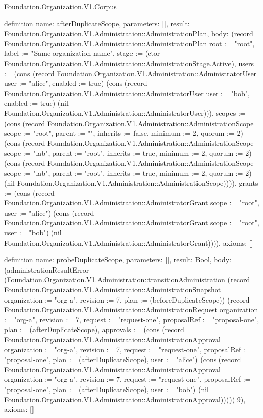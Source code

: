 \begin{lexlean}{Foundation.Organization.V1.Corpus}
\begin{semanticmodule}
definition{
  name: afterDuplicateScope,
  parameters: [],
  result: Foundation.Organization.V1.Administration::AdministrationPlan,
  body: (record Foundation.Organization.V1.Administration::AdministrationPlan {root := "root", label := "Same organization name", stage := (ctor Foundation.Organization.V1.Administration::AdministrationStage.Active), users := (cons (record Foundation.Organization.V1.Administration::AdministratorUser {user := "alice", enabled := true}) (cons (record Foundation.Organization.V1.Administration::AdministratorUser {user := "bob", enabled := true}) (nil Foundation.Organization.V1.Administration::AdministratorUser))), scopes := (cons (record Foundation.Organization.V1.Administration::AdministrationScope {scope := "root", parent := "", inherits := false, minimum := 2, quorum := 2}) (cons (record Foundation.Organization.V1.Administration::AdministrationScope {scope := "lab", parent := "root", inherits := true, minimum := 2, quorum := 2}) (cons (record Foundation.Organization.V1.Administration::AdministrationScope {scope := "lab", parent := "root", inherits := true, minimum := 2, quorum := 2}) (nil Foundation.Organization.V1.Administration::AdministrationScope)))), grants := (cons (record Foundation.Organization.V1.Administration::AdministratorGrant {scope := "root", user := "alice"}) (cons (record Foundation.Organization.V1.Administration::AdministratorGrant {scope := "root", user := "bob"}) (nil Foundation.Organization.V1.Administration::AdministratorGrant)))}),
  axioms: []
}

definition{
  name: probeDuplicateScope,
  parameters: [],
  result: Bool,
  body: (administrationResultError (Foundation.Organization.V1.Administration::transitionAdministration (record Foundation.Organization.V1.Administration::AdministrationSnapshot {organization := "org-a", revision := 7, plan := (beforeDuplicateScope)}) (record Foundation.Organization.V1.Administration::AdministrationRequest {organization := "org-a", revision := 7, request := "request-one", proposalRef := "proposal-one", plan := (afterDuplicateScope), approvals := (cons (record Foundation.Organization.V1.Administration::AdministrationApproval {organization := "org-a", revision := 7, request := "request-one", proposalRef := "proposal-one", plan := (afterDuplicateScope), user := "alice"}) (cons (record Foundation.Organization.V1.Administration::AdministrationApproval {organization := "org-a", revision := 7, request := "request-one", proposalRef := "proposal-one", plan := (afterDuplicateScope), user := "bob"}) (nil Foundation.Organization.V1.Administration::AdministrationApproval)))})) 9),
  axioms: []
}


\end{semanticmodule}
\end{lexlean}
